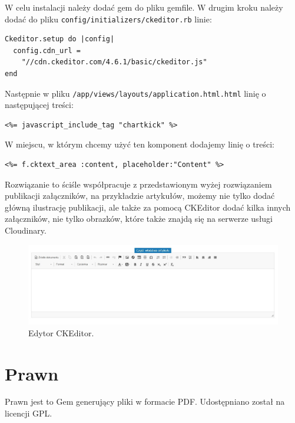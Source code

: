 \documentclass[openright]{xmgr}
\begin{document}
W celu instalacji należy dodać gem do pliku gemfile. W drugim kroku należy dodać do pliku \texttt{config/initializers/ckeditor.rb} linie: 
\begin{lstlisting}[language=ruby2, caption={Framgent zawartości pliku ckeditor.rb}]
Ckeditor.setup do |config|
  config.cdn_url = 
	"//cdn.ckeditor.com/4.6.1/basic/ckeditor.js"
end
\end{lstlisting}

\newpage

Następnie w pliku \texttt{/app/views/layouts/application.html.html} linię o następującej treści:
\begin{lstlisting}[language=ruby2, caption={Framgent zawartości pliku application.html.rb}]
<%= javascript_include_tag "chartkick" %>
\end{lstlisting}
W miejscu, w którym chcemy użyć ten komponent dodajemy linię o treści:
\begin{lstlisting}[language=ruby2, caption={Kod uruchamiajacy edytor}]
<%= f.cktext_area :content, placeholder:"Content" %>
\end{lstlisting}
Rozwiązanie to ściśle współpracuje z przedstawionym wyżej rozwiązaniem publikacji załączników, na przykładzie artykułów, możemy nie tylko dodać główną ilustrację publikacji, ale także za pomocą CKEditor dodać kilka innych załączników, nie tylko obrazków, które także znajdą się na serwerze usługi Cloudinary. 

\begin{figure}[!tbh]
\centering
\includegraphics[width=\linewidth]{fig/ckeditor}
\caption{Edytor CKEditor.}
\end{figure}

\newpage

\section{Prawn}
Prawn \cite{prawn} jest to Gem generujący pliki w formacie PDF. Udostępniano został na licencji GPL.
\end{document}
